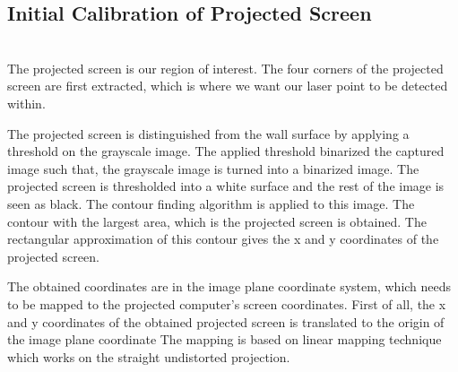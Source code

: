 \documentclass[12pt, a4paper]{article}
\begin{document}
\subsection{Initial Calibration of Projected Screen}
~\\
	 The projected screen is our region of interest. The four corners of the projected screen are first extracted, which is where we want our laser point to be detected within. 
	 
    The projected screen is distinguished from the wall surface by applying a threshold on the grayscale image. The applied threshold binarized the captured image such that, the grayscale image is turned into a binarized image. The projected screen is thresholded into a white surface and the rest of the image is seen as black. The contour finding algorithm is applied to this image. The contour with the largest area, which is the projected screen is obtained. The rectangular approximation of this contour gives the x and y coordinates of the projected screen. 
 
    The obtained coordinates are in the image plane coordinate system, which needs to be mapped to the projected computer’s screen coordinates. First of all, the x and y coordinates of the obtained projected screen is translated to the origin of the image plane coordinate 
The mapping is based on linear mapping technique which works on the straight undistorted projection. 
\end{document}
